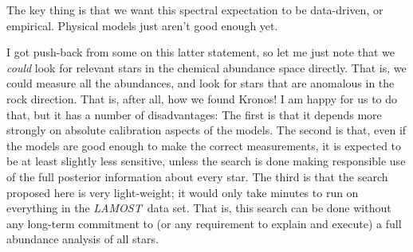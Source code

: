 \documentclass[12pt]{article}
\newcommand{\project}[1]{\textsl{#1}}
\newcommand{\acronym}[1]{{\small{#1}}}
\newcommand{\LAMOST}{\project{\acronym{LAMOST}}}
\begin{document}
The key thing is that we want this spectral expectation to be data-driven,
or empirical.
Physical models just aren't good enough yet.

I got push-back from some on this latter statement, so let me just note
that we \emph{could} look for relevant stars in the chemical abundance
space directly.
That is, we could measure all the abundances, and look for stars that
are anomalous in the rock direction.
That is, after all, how we found Kronos!
I am happy for us to do that, but it has a number of disadvantages:
The first is that it depends more strongly on absolute calibration aspects
of the models.
The second is that, even if the models are good enough to make the correct
measurements, it is expected to be at least slightly less sensitive,
unless the search is done making responsible use of the full posterior
information about every star.
The third is that the search proposed here is very light-weight; it would
only take minutes to run on everything in
the \LAMOST\ data set.
That is, this search can be done without any long-term commitment to
(or any requirement to explain and execute) a full abundance analysis
of all stars.
\end{document}
